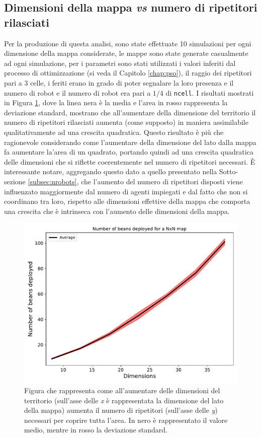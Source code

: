 \subsection{Dimensioni della mappa \textit{vs} numero di ripetitori rilasciati}
Per la produzione di questa analisi, sono state effettuate 10 simulazioni per ogni dimensione della mappa considerate, le mappe sono state generate casualmente ad ogni simulazione, per i parametri sono stati utilizzati i valori inferiti dal processo di ottimizzazione (si veda il Capitolo \ref{chap:pso}), il raggio dei ripetitori pari a 3 celle, i feriti erano in grado di poter segnalare la loro presenza e il numero di robot e il numero di robot era pari a $1/4$ di \texttt{ncell}.
I risultati mostrati in Figura \ref{fig:beans}, dove la linea nera è la media e l'area in rosso rappresenta la deviazione standard, mostrano che all'aumentare della dimensione del territorio il numero di ripetitori rilasciati aumenta (come supposto) in maniera assimilabile qualitativamente ad una crescita quadratica.
Questo risultato è più che ragionevole considerando come l'aumentare della dimensione del lato dalla mappa fa aumentare la'area di un quadrato, portando quindi ad una crescita quadratica delle dimensioni che si riflette coerentemente nel numero di ripetitori necessari.
È interessante notare, aggregando questo dato a quello presentato nella Sotto-sezione \ref{subsec:nrobots}, che l'aumento del numero di ripetitori disposti viene influenzato maggiormente dal numero di agenti impiegati e dal fatto che non si coordinano tra loro, rispetto alle dimensioni effettive della mappa che comporta una crescita che è intrinseca con l'aumento delle dimensioni della mappa.
\begin{figure}
	\centering
	\includegraphics[width=0.9\linewidth]{images/macro_results/beans}
	\caption{Figura che rappresenta come all'aumentare delle dimensioni del territorio (sull'asse delle \textit{x} è rappresentata la dimensione del lato della mappa) aumenta il numero di ripetitori (sull'asse delle \textit{y}) necessari per coprire tutta l'area. In nero è rappresentato il valore medio, mentre in rosso la deviazione standard.}
	\label{fig:beans}
\end{figure}

